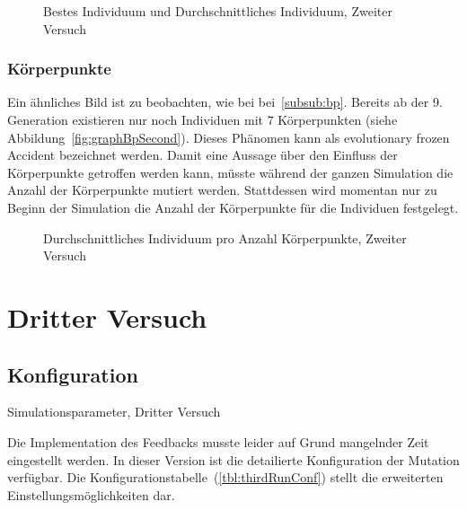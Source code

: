       \begin{figure}
        \centering
        
        \caption{Bestes Individuum und Durchschnittliches Individuum, Zweiter Versuch\label{fig:graphSecond}}
      \end{figure}

      \subsubsection{Körperpunkte\label{subsub:bpScnd}}

        Ein ähnliches Bild ist zu beobachten, wie bei bei~\vref{subsub:bp}.
        Bereits ab der 9\@. Generation existieren nur noch Individuen mit 7 Körperpunkten (siehe Abbildung~\vref{fig:graphBpSecond}).
        Dieses Phänomen kann als evolutionary frozen Accident bezeichnet werden.
        Damit eine Aussage über den Einfluss der Körperpunkte getroffen werden kann,
        müsste während der ganzen Simulation die Anzahl der Körperpunkte mutiert werden.
        Stattdessen wird momentan nur zu Beginn der Simulation die Anzahl der Körperpunkte für die Individuen festgelegt.

        \begin{figure}
          \centering
          
          \caption{Durchschnittliches Individuum pro Anzahl Körperpunkte, Zweiter Versuch\label{fig:graphBpSecond}}
        \end{figure}

    \section{Dritter Versuch}

      \subsection{Konfiguration}

        \begin{table}[H]
          \centering
          
          \caption{Simulationsparameter, Dritter Versuch \label{tbl:thirdRunConf}}
        \end{table}

        Die Implementation des Feedbacks musste leider auf Grund mangelnder Zeit eingestellt werden.
        In dieser Version ist die detailierte Konfiguration der Mutation verfügbar.
        Die Konfigurationstabelle~(\vref{tbl:thirdRunConf}) stellt die erweiterten Einstellungsmöglichkeiten dar.


